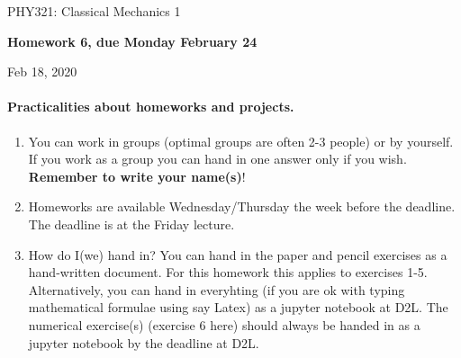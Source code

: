 \documentclass[%
oneside,                 %
final,                   %
10pt]{article}
\begin{document}

\newcommand{\exercisesection}[1]{\subsection*{#1}}






\thispagestyle{empty}

\begin{center}
{\LARGE\bf
\begin{spacing}{1.25}
PHY321: Classical Mechanics 1
\end{spacing}
}
\end{center}


\begin{center}
{\bf Homework 6, due Monday  February 24${}^{}$} \\ [0mm]
\end{center}

\begin{center}
\end{center}
    

\begin{center}
Feb 18, 2020
\end{center}

\vspace{1cm}


\paragraph{Practicalities about  homeworks and projects.}
\begin{enumerate}
\item You can work in groups (optimal groups are often 2-3 people) or by yourself. If you work as a group you can hand in one answer only if you wish. \textbf{Remember to write your name(s)}!

\item Homeworks are available Wednesday/Thursday the week before the deadline. The deadline is at the Friday lecture.

\item How do I(we)  hand in?  You can hand in the paper and pencil exercises as a hand-written document. For this homework this applies to exercises 1-5. Alternatively, you can hand in everyhting (if you are ok with typing mathematical formulae using say Latex) as a jupyter notebook at D2L. The numerical exercise(s) (exercise 6 here) should always be handed in as a jupyter notebook by the deadline at D2L. 
\end{enumerate}
\end{document}
